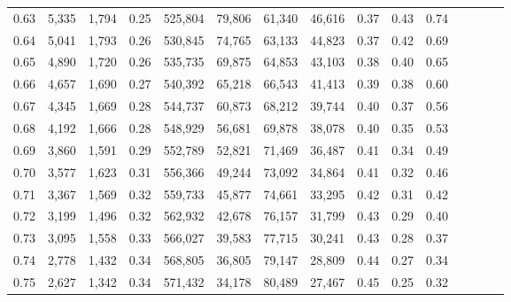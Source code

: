 \begin{tabular}{rrrcrrrrrrrrrrr}
0.63 &   5,335 &  1,794 &                                       0.25 &  525,804 &   79,806 &   61,340 &   46,616 &  0.37 &  0.43 &                         0.74 \\
0.64 &   5,041 &  1,793 &                                       0.26 &  530,845 &   74,765 &   63,133 &   44,823 &  0.37 &  0.42 &                         0.69 \\
0.65 &   4,890 &  1,720 &                                       0.26 &  535,735 &   69,875 &   64,853 &   43,103 &  0.38 &  0.40 &                         0.65 \\
0.66 &   4,657 &  1,690 &                                       0.27 &  540,392 &   65,218 &   66,543 &   41,413 &  0.39 &  0.38 &                         0.60 \\
0.67 &   4,345 &  1,669 &                                       0.28 &  544,737 &   60,873 &   68,212 &   39,744 &  0.40 &  0.37 &                         0.56 \\
0.68 &   4,192 &  1,666 &                                       0.28 &  548,929 &   56,681 &   69,878 &   38,078 &  0.40 &  0.35 &                         0.53 \\
0.69 &   3,860 &  1,591 &                                       0.29 &  552,789 &   52,821 &   71,469 &   36,487 &  0.41 &  0.34 &                         0.49 \\
0.70 &   3,577 &  1,623 &                                       0.31 &  556,366 &   49,244 &   73,092 &   34,864 &  0.41 &  0.32 &                         0.46 \\
0.71 &   3,367 &  1,569 &                                       0.32 &  559,733 &   45,877 &   74,661 &   33,295 &  0.42 &  0.31 &                         0.42 \\
0.72 &   3,199 &  1,496 &                                       0.32 &  562,932 &   42,678 &   76,157 &   31,799 &  0.43 &  0.29 &                         0.40 \\
0.73 &   3,095 &  1,558 &                                       0.33 &  566,027 &   39,583 &   77,715 &   30,241 &  0.43 &  0.28 &                         0.37 \\
0.74 &   2,778 &  1,432 &                                       0.34 &  568,805 &   36,805 &   79,147 &   28,809 &  0.44 &  0.27 &                         0.34 \\
0.75 &   2,627 &  1,342 &                                       0.34 &  571,432 &   34,178 &   80,489 &   27,467 &  0.45 &  0.25 &                         0.32 \\

\end{tabular}
